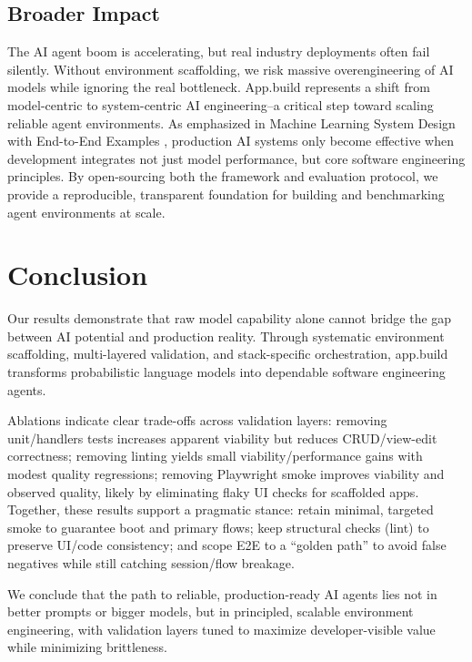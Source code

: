 \documentclass{article}
\begin{document}
\subsection{Broader Impact}
\label{sec:broader-impact}

The AI agent boom is accelerating, but real industry deployments often fail silently. Without environment scaffolding, we risk massive overengineering of AI models while ignoring the real bottleneck. App.build represents a shift from model-centric to system-centric AI engineering--a critical step toward scaling reliable agent environments. As emphasized in Machine Learning System Design with End-to-End Examples \citep{babushkin2025machine}, production AI systems only become effective when development integrates not just model performance, but core software engineering principles. By open-sourcing both the framework and evaluation protocol, we provide a reproducible, transparent foundation for building and benchmarking agent environments at scale.

\section{Conclusion}
\label{sec:conclusion}

Our results demonstrate that raw model capability alone cannot bridge the gap between AI potential and production reality. Through systematic environment scaffolding, multi-layered validation, and stack-specific orchestration, app.build transforms probabilistic language models into dependable software engineering agents.

Ablations indicate clear trade-offs across validation layers: removing unit/handlers tests increases apparent viability but reduces CRUD/view-edit correctness; removing linting yields small viability/performance gains with modest quality regressions; removing Playwright smoke improves viability and observed quality, likely by eliminating flaky UI checks for scaffolded apps. Together, these results support a pragmatic stance: retain minimal, targeted smoke to guarantee boot and primary flows; keep structural checks (lint) to preserve UI/code consistency; and scope E2E to a ``golden path'' to avoid false negatives while still catching session/flow breakage.

We conclude that the path to reliable, production-ready AI agents lies not in better prompts or bigger models, but in principled, scalable environment engineering, with validation layers tuned to maximize developer-visible value while minimizing brittleness.
\end{document}
